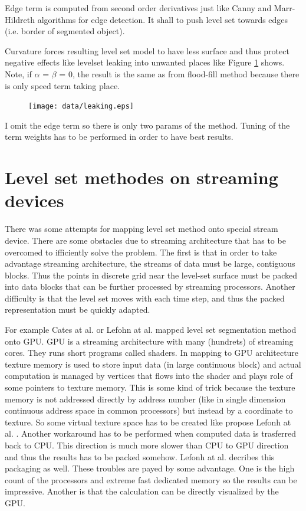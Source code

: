 Edge term is computed from second order derivatives just like Canny and Marr-Hildreth algorithms for edge detection. It shall to push level set towards edges (i.e. border of segmented object).

Curvature forces resulting level set model to have less surface and thus protect negative effects like levelset leaking into unwanted places like Figure \ref{fg:leaking} shows. Note, if $\alpha$ = $\beta$ = 0, the result is the same as from flood-fill method because there is only speed term taking place.

\begin{figure}
    \centering
    \texttt{[image: data/leaking.eps]}
    \caption[Leaking of segmentaion into unwanted places]{}
    \label{fg:leaking}
\end{figure}

I omit the edge term so there is only two params of the method. Tuning of the term weights has to be performed in order to have best results.

\section{Level set methodes on streaming devices}

\par
There was some attempts for mapping level set method onto special stream device. There are some obstacles due to streaming architecture that has to be overcomed to ifficiently solve the problem. The ﬁrst is that in order to take advantage streaming architecture, the streams of data must be large, contiguous blocks. Thus the points in discrete grid near the level-set surface must be packed into data blocks that can be further processed by streaming processors. Another difficulty is that the level set moves with each time step, and thus the packed representation must be quickly adapted.

\par
For example Cates at al. \cite{GIST} or Lefohn at al. \cite{lefonhGPUSolver} mapped level set segmentation method onto GPU. GPU is a streaming architecture with many (hundrets) of streaming cores. They runs short programs called shaders. In mapping to GPU architecture texture memory is used to store input data (in large continuous block) and actual computation is managed by vertices that flows into the shader and plays role of some pointers to texture memory. This is some kind of trick because the texture memory is not addressed directly by address number (like in single dimension continuous address space in common processors) but instead by a coordinate to texture. So some virtual texture space has to be created like propose Lefonh at al. \cite{lefonhGPUSolver}. Another workaround has to be performed when computed data is trasferred back to CPU. This direction is much more slower than CPU to GPU direction and thus the results has to be packed somehow. Lefonh at al. \cite{lefonhGPUSolver} decribes this packaging as well. These troubles are payed by some advantage. One is the high count of the processors and extreme fast dedicated memory so the results can be impressive. Another is that the calculation can be directly visualized by the GPU.

